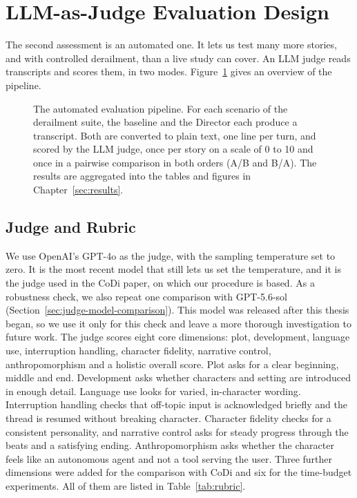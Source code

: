 \section{LLM-as-Judge Evaluation Design}\label{sec:design-judge}

The second assessment is an automated one. It lets us test many more stories, and with controlled derailment, than a live study can cover. An LLM judge reads transcripts and scores them, in two modes. Figure~\ref{fig:eval-pipeline} gives an overview of the pipeline.

\begin{figure}[htbp]
\centering
\resizebox{\linewidth}{!}{}
\caption{The automated evaluation pipeline. For each scenario of the derailment suite, the baseline and the Director each produce a transcript. Both are converted to plain text, one line per turn, and scored by the LLM judge, once per story on a scale of 0 to 10 and once in a pairwise comparison in both orders (A/B and B/A). The results are aggregated into the tables and figures in Chapter~\ref{sec:results}.}
\label{fig:eval-pipeline}
\end{figure}

\subsection{Judge and Rubric}

We use OpenAI's GPT-4o as the judge, with the sampling temperature set to zero. It is the most recent model that still lets us set the temperature, and it is the judge used in the CoDi paper, on which our procedure is based. As a robustness check, we also repeat one comparison with GPT-5.6-sol (Section~\ref{sec:judge-model-comparison}). This model was released after this thesis began, so we use it only for this check and leave a more thorough investigation to future work. The judge scores eight core dimensions: plot, development, language use, interruption handling, character fidelity, narrative control, anthropomorphism and a holistic overall score. Plot asks for a clear beginning, middle and end. Development asks whether characters and setting are introduced in enough detail. Language use looks for varied, in-character wording. Interruption handling checks that off-topic input is acknowledged briefly and the thread is resumed without breaking character. Character fidelity checks for a consistent personality, and narrative control asks for steady progress through the beats and a satisfying ending. Anthropomorphism asks whether the character feels like an autonomous agent and not a tool serving the user. Three further dimensions were added for the comparison with CoDi and six for the time-budget experiments. All of them are listed in Table~\ref{tab:rubric}.

